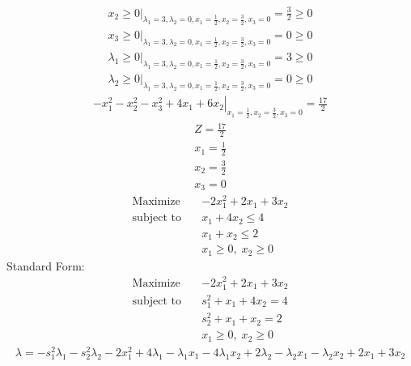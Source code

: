 \documentclass{article}
\begin{document}
\begin{align*}
\left.x_{2}\ge0\right|_{\lambda_{1}=3,\lambda_{2}=0,x_{1}=\frac{1}{2},x_{2}=\frac{3}{2},x_{3}=0}=\frac{3}{2}\ge0\end{align*}
\begin{align*}
\left.x_{3}\ge0\right|_{\lambda_{1}=3,\lambda_{2}=0,x_{1}=\frac{1}{2},x_{2}=\frac{3}{2},x_{3}=0}=0\ge0\end{align*}
\begin{align*}
\left.\lambda_{1}\ge0\right|_{\lambda_{1}=3,\lambda_{2}=0,x_{1}=\frac{1}{2},x_{2}=\frac{3}{2},x_{3}=0}=3\ge0\end{align*}
\begin{align*}
\left.\lambda_{2}\ge0\right|_{\lambda_{1}=3,\lambda_{2}=0,x_{1}=\frac{1}{2},x_{2}=\frac{3}{2},x_{3}=0}=0\ge0\end{align*}
\begin{align*}
\left.-x_{1}^{2} - x_{2}^{2} - x_{3}^{2} + 4x_{1} + 6x_{2}\right|_{x_{1}=\frac{1}{2},x_{2}=\frac{3}{2},x_{3}=0}=\frac{17}{2}\end{align*}
\begin{align*}
Z=\frac{17}{2}\end{align*}
\begin{align*}
x_{1}=\frac{1}{2}\end{align*}
\begin{align*}
x_{2}=\frac{3}{2}\end{align*}
\begin{align*}
x_{3}=0\end{align*}
\begin{align*}
\text{Maximize} \quad & -2x_{1}^{2} + 2x_{1} + 3x_{2}\\
\text{subject to} \quad
& x_{1} + 4x_{2}\le4\\
& x_{1} + x_{2}\le2\\
& x_{1}\ge0,\; x_{2}\ge0\end{align*}
Standard Form:\\
\begin{align*}
\text{Maximize} \quad & -2x_{1}^{2} + 2x_{1} + 3x_{2}\\
\text{subject to} \quad
& s_{1}^{2} + x_{1} + 4x_{2}=4\\
& s_{2}^{2} + x_{1} + x_{2}=2\\
& x_{1}\ge0,\; x_{2}\ge0\end{align*}
\begin{align*}
\lambda=-s_{1}^{2}\lambda_{1} - s_{2}^{2}\lambda_{2} - 2x_{1}^{2} + 4\lambda_{1} - \lambda_{1}x_{1} - 4\lambda_{1}x_{2} + 2\lambda_{2} - \lambda_{2}x_{1} - \lambda_{2}x_{2} + 2x_{1} + 3x_{2}\end{align*}
\end{document}
